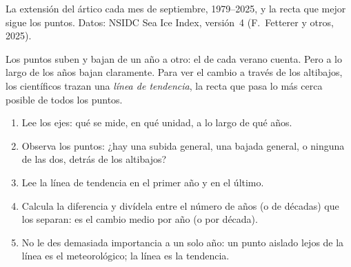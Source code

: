 \begin{omfigure}

{\small La extensión del  ártico cada mes de septiembre,
1979--2025, y la recta que mejor sigue los puntos. Datos: NSIDC Sea Ice
Index, versión~4 (F.~Fetterer y otros, 2025).}
\label{fig:g8:ice-on-earth:sea-ice}
\end{omfigure}

Los puntos suben y bajan de un año a otro: el  de cada verano
cuenta. Pero a lo largo de los años bajan claramente. Para ver el cambio a
través de los altibajos, los científicos trazan una \emph{línea de
tendencia}, la recta que pasa lo más cerca posible de todos los puntos.

\begin{method}
\begin{enumerate}
  \item Lee los ejes: qué se mide, en qué unidad, a lo largo de qué años.
  \item Observa los puntos: ¿hay una subida general, una bajada general, o
        ninguna de las dos, detrás de los altibajos?
  \item Lee la línea de tendencia en el primer año y en el último.
  \item Calcula la diferencia y divídela entre el número de años (o de
        décadas) que los separan: es el cambio medio por año (o por
        década).
  \item No le des demasiada importancia a un solo año: un punto aislado
        lejos de la línea es el  meteorológico; la línea es la
        tendencia.
\end{enumerate}
\end{method}

